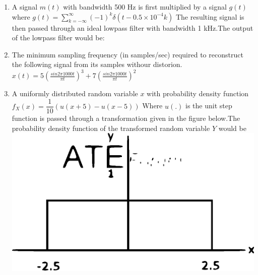 \documentclass[journal,12pt,twocolumn]{IEEEtran}
\begin{document}
\begin{enumerate}
\begin{enumerate}[(A)]
\end{enumerate}

\item A signal $m(t)$ with bandwidth 500 Hz is first multiplied by a signal $g(t)$ where $g(t)=\sum_{k=-\infty}^{\infty}(-1)^{k}\delta(t-0.5\times 10^{-4}k)$ \newline The resulting signal is then passed through an ideal lowpass filter with bandwidth 1 kHz.The output of the lowpass filter would be:
\begin{enumerate}[(A)]
\end{enumerate}

\item The minimum sampling frequency (in samples/sec) required to reconstruct the following signal from its samples withour distorion. \newline $x(t)=5(\frac{sin 2\pi 1000 t}{\pi t})^{3}+7(\frac{sin 2\pi 1000 t}{\pi t})^{2}$\\
\begin{enumerate}[(A)]
\end{enumerate}

\item A uniformly distributed random variable $x$ with probability density function $f_X(x)=\dfrac{1}{10}(u(x+5)-u(x-5))$ \newline Where $u(.)$ is the unit step function is passed through a transformation given in the figure below.The probability density function of the transformed random variable $Y$ would be\\
\includegraphics[scale=0.3]{fig7.eps}


\end{enumerate}
\end{document}
